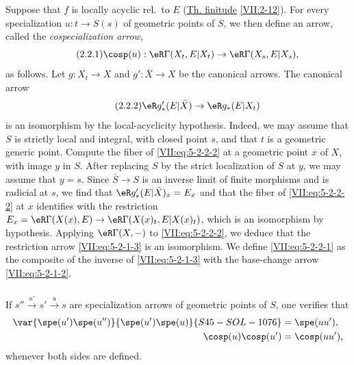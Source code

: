 Suppose that $f$ is locally acyclic rel.\ to $E$ (\hyperref[VII]{Th. finitude} \ref{VII:2-12}). For
every specialization $u:t\to S(s)$ of geometric points of $S$, we then define
an arrow, called the \emph{cospecialization arrow},
\begin{equation*}\tag{2.2.1}\label{VII:eq:5-2-2-1}
  \cosp(u):\eR\Gamma(X_t,E|X_t) \to \eR\Gamma(X_s,E|X_s) \text{,} 
\end{equation*}
as follows. Let $g:X_t\to X$ and $g':\bar X\to X$ be the canonical arrows.
The canonical arrow
\begin{equation*}\tag{2.2.2}\label{VII:eq:5-2-2-2}
  \eR g'_\ast(E|\bar X)\to \eR g_\ast(E|X_t) 
\end{equation*}
is an isomorphism by the local-acyclicity hypothesis. Indeed, we may assume
that $S$ is strictly local and integral, with closed point $s$, and that $t$
is a geometric generic point. Compute the fiber of
\eqref{VII:eq:5-2-2-2} at a geometric point $x$ of $X$, with image $y$ in
$S$. After replacing $S$ by the strict localization of $S$ at $y$, we may
assume that $y=s$. Since $\bar S\to S$ is an inverse limit of finite
morphisms and is radicial at $s$, we find that
$\eR g'_\ast(E|\bar X)_x = E_x$ and that the fiber of
\eqref{VII:eq:5-2-2-2} at $x$ identifies with the restriction
$E_x=\eR\Gamma(X(x),E)\to \eR\Gamma(X(x)_t,E|X(x)_t)$, which is an
isomorphism by hypothesis. Applying $\eR\Gamma(X,-)$ to
\eqref{VII:eq:5-2-2-2}, we deduce that the restriction arrow
\eqref{VII:eq:5-2-1-3} is an isomorphism. We define
\eqref{VII:eq:5-2-2-1} as the composite of the inverse of
\eqref{VII:eq:5-2-1-3} with the base-change arrow
\eqref{VII:eq:5-2-1-2}.






\subsubsection{}\label{VII:5-2-3}

If $s'' \xrightarrow{u'} s' \xrightarrow u s$ are specialization arrows of
geometric points of $S$, one verifies that
\begin{align*}
  \var{\spe(u')\spe(u'')}{\spe(u')\spe(u)}{S45-SOL-1076} &= \spe(u u') \text{,} \\
  \cosp(u) \cosp(u') &= \cosp(u u') \text{,} 
\end{align*}
whenever both sides are defined.






\subsubsection{}\label{VII:5-2-4}

